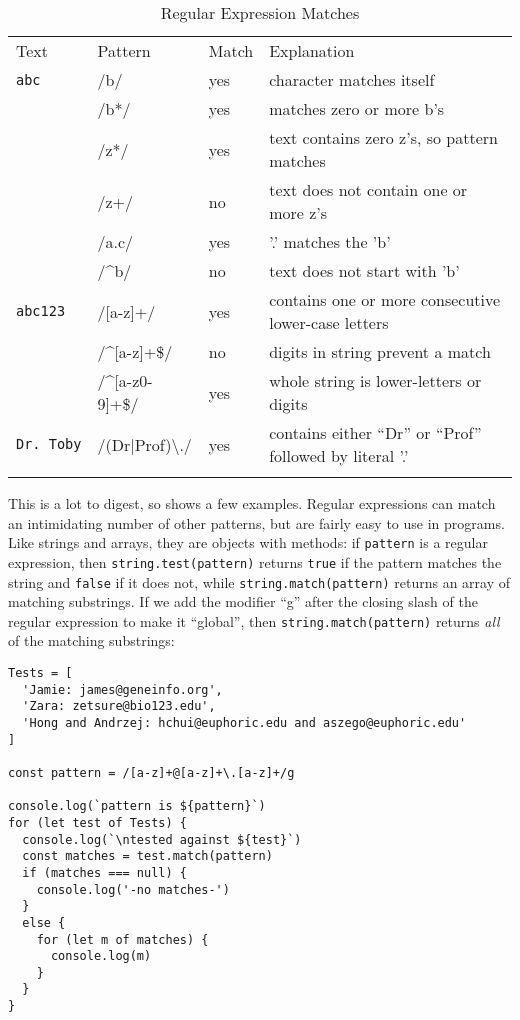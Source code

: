 \begin{longtable}{llll}
Text
& Pattern
& Match
& Explanation
\\

\texttt{abc}
& /b/
& yes
&
character matches itself
\\

& /b*/
& yes
& matches zero or more b's
\\

& /z*/
& yes
& text contains zero z's, so pattern matches
\\

& /z+/
& no
& text does not contain one or more z's
\\

& /a.c/
& yes
& '.' matches the 'b'
\\

& /{\textasciicircum}b/
& no
& text does not start with 'b'
\\

\texttt{abc123}
& /[a-z]+/
& yes
& contains one or more consecutive lower-case letters
\\

& /{\textasciicircum}[a-z]+\$/
& no
& digits in string prevent a match
\\

& /{\textasciicircum}[a-z0-9]+\$/
& yes
& whole string is lower-letters or digits
\\

\texttt{Dr.\ Toby}
& /(Dr|Prof){\textbackslash}./
& yes & contains either ``Dr'' or ``Prof'' followed by literal '.'
\\

\caption{Regular Expression Matches}
\label{t:regexp-examples}
\end{longtable}

This is a lot to digest,
so  shows a few examples.
Regular expressions can match an intimidating number of other patterns,
but are fairly easy to use in programs.
Like strings and arrays,
they are objects with methods:
if \texttt{pattern} is a regular expression,
then \texttt{string.test(pattern)} returns \texttt{true} if the pattern matches the string
and \texttt{false} if it does not,
while \texttt{string.match(pattern)} returns an array of matching substrings.
If we add the modifier ``g'' after the closing slash of the regular expression to make it ``global'',
then \texttt{string.match(pattern)} returns \emph{all} of the matching substrings:

\begin{verbatim}
Tests = [
  'Jamie: james@geneinfo.org',
  'Zara: zetsure@bio123.edu',
  'Hong and Andrzej: hchui@euphoric.edu and aszego@euphoric.edu'
]

const pattern = /[a-z]+@[a-z]+\.[a-z]+/g

console.log(`pattern is ${pattern}`)
for (let test of Tests) {
  console.log(`\ntested against ${test}`)
  const matches = test.match(pattern)
  if (matches === null) {
    console.log('-no matches-')
  }
  else {
    for (let m of matches) {
      console.log(m)
    }
  }
}
\end{verbatim}

